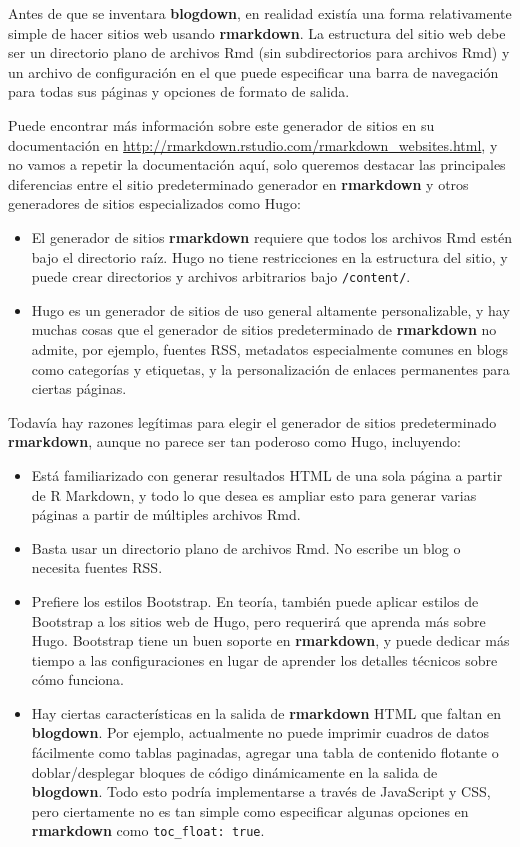 \documentclass[12pt,]{krantz}
\theoremstyle{definition}
\theoremstyle{definition}
\theoremstyle{definition}
\theoremstyle{remark}
\begin{document}
Antes de que se inventara
\textbf{blogdown}, en realidad
existía una forma relativamente simple de hacer sitios web usando
\textbf{rmarkdown}. La estructura del sitio web debe ser un directorio
plano de archivos Rmd (sin subdirectorios para archivos Rmd) y un
archivo de configuración en el que puede especificar una barra de
navegación para todas sus páginas y opciones de formato de salida.

Puede encontrar más información sobre este generador de sitios en su
documentación en
\url{http://rmarkdown.rstudio.com/rmarkdown_websites.html}, y no vamos a
repetir la documentación aquí, solo queremos destacar las principales
diferencias entre el sitio predeterminado generador en
\textbf{rmarkdown} y otros generadores de sitios especializados como
Hugo:

\begin{itemize}
\item
  El generador de sitios \textbf{rmarkdown} requiere que todos los
  archivos Rmd estén bajo el directorio raíz. Hugo no tiene
  restricciones en la estructura del sitio, y puede crear directorios y
  archivos arbitrarios bajo \texttt{/content/}.
\item
  Hugo es un generador de sitios de uso general altamente
  personalizable, y hay muchas cosas que el generador de sitios
  predeterminado de \textbf{rmarkdown} no admite, por ejemplo, fuentes
  RSS, metadatos especialmente comunes en blogs como categorías y
  etiquetas, y la personalización de enlaces permanentes para ciertas
  páginas.
\end{itemize}

Todavía hay razones legítimas para elegir el generador de sitios
predeterminado \textbf{rmarkdown}, aunque no parece ser tan poderoso
como Hugo, incluyendo:

\begin{itemize}
\item
  Está familiarizado con generar resultados HTML de una sola página a
  partir de R Markdown, y todo lo que desea es ampliar esto para generar
  varias páginas a partir de múltiples archivos Rmd.
\item
  Basta usar un directorio plano de archivos Rmd. No escribe un blog o
  necesita fuentes RSS.
\item
  Prefiere los estilos Bootstrap. En teoría, también puede aplicar
  estilos de Bootstrap a los sitios web de Hugo, pero requerirá que
  aprenda más sobre Hugo. Bootstrap tiene un buen soporte en
  \textbf{rmarkdown}, y puede dedicar más tiempo a las configuraciones
  en lugar de aprender los detalles técnicos sobre cómo funciona.
\item
  Hay ciertas características en la salida de \textbf{rmarkdown} HTML
  que faltan en \textbf{blogdown}. Por ejemplo, actualmente no puede
  imprimir cuadros de datos fácilmente como tablas paginadas, agregar
  una tabla de contenido flotante o doblar/desplegar bloques de código
  dinámicamente en la salida de \textbf{blogdown}. Todo esto podría
  implementarse a través de JavaScript y CSS, pero ciertamente no es tan
  simple como especificar algunas opciones en \textbf{rmarkdown} como
  \texttt{toc\_float:\ true}.
\end{itemize}
\end{document}
